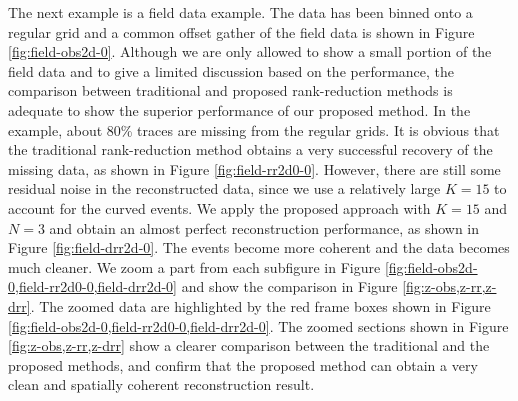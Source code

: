 The next example is a field data example. The data has been binned onto a regular grid and a common offset gather of the field data is shown in Figure \ref{fig:field-obs2d-0}. Although we are only allowed to show a small portion of the field data and to give a limited discussion based on the performance, the comparison between traditional and proposed rank-reduction methods is adequate to show the superior performance of our proposed method. In the example, about 80\% traces are missing from the regular grids. It is obvious that the traditional rank-reduction method obtains a very successful recovery of the missing data, as shown in Figure \ref{fig:field-rr2d0-0}. However, there are still some residual noise in the reconstructed data, since we use a relatively large $K=15$ to account for the curved events. We apply the proposed approach with $K=15$ and $N=3$ and obtain an almost perfect reconstruction performance, as shown in Figure \ref{fig:field-drr2d-0}. The events become more coherent and the data becomes much cleaner. We zoom a part from each subfigure in Figure \ref{fig:field-obs2d-0,field-rr2d0-0,field-drr2d-0} and show the comparison in Figure \ref{fig:z-obs,z-rr,z-drr}. The zoomed data are highlighted by the red frame boxes shown in Figure \ref{fig:field-obs2d-0,field-rr2d0-0,field-drr2d-0}. The zoomed sections shown in Figure \ref{fig:z-obs,z-rr,z-drr} show a clearer comparison between the traditional and the proposed methods, and confirm that the proposed method can obtain a very clean and spatially coherent reconstruction result. 



